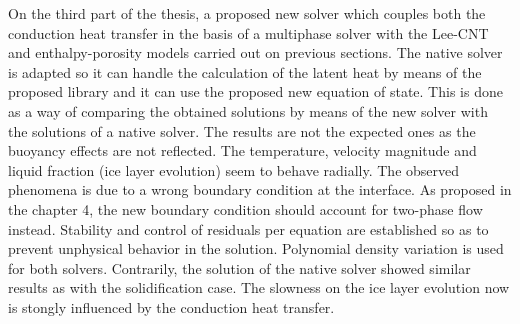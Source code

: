 \noindent On the third part of the thesis, a proposed new solver which couples both the conduction heat transfer in the basis of a multiphase solver with the Lee-CNT and enthalpy-porosity models carried out on previous sections. The native solver is adapted so it can handle the calculation of the latent heat by means of the proposed library and it can use the proposed new equation of state. This is done as a way of comparing the obtained solutions by means of the new solver with the solutions of a native solver. The results are not the expected ones as the buoyancy effects are not reflected. The temperature, velocity magnitude and liquid fraction (ice layer evolution) seem to behave radially. The observed phenomena is due to a wrong boundary condition at the interface. As proposed in the chapter 4, the new boundary condition should account for two-phase flow instead. Stability and control of residuals per equation are established so as to prevent unphysical behavior in the solution. Polynomial density variation is used for both solvers. 
Contrarily, the solution of the native solver showed similar results as with the solidification case. The slowness on the ice layer evolution now is stongly influenced by the conduction heat transfer. 

